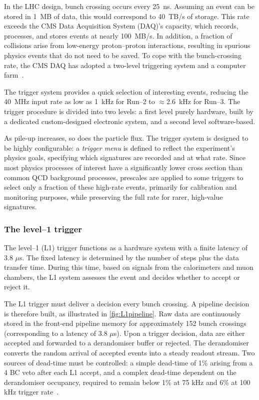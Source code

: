 In the LHC design, bunch crossing occurs every 25~ns. Assuming an event can be stored in 1~MB of data, this would correspond to 40~TB/s of storage. This rate exceeds the CMS Data Acquisition System (DAQ)'s capacity, which records, processes, and stores events at nearly 100~MB/s. In addition, a fraction of collisions arise from low-energy proton--proton interactions, resulting in spurious physics events that do not need to be saved. To cope with the bunch-crossing rate, the CMS DAQ has adopted a two-level triggering system and a computer farm~\cite{CMStrigger}. 

The trigger system provides a quick selection of interesting events, reducing the 40~MHz input rate as low as 1~kHz for Run--2 to $\approx$2.6~kHz for Run--3. The trigger procedure is divided into two levels: a first level purely hardware, built by a dedicated custom-designed electronic system, and a second level software-based.

As pile-up increases, so does the particle flux. The trigger system is designed to be highly configurable: a \textit{trigger menu} is defined to reflect the experiment's physics goals, specifying which signatures are recorded and at what rate. Since most physics processes of interest have a significantly lower cross section than common QCD background processes, prescales are applied to some triggers to select only a fraction of these high-rate events, primarily for calibration and monitoring purposes, while preserving the full rate for rarer, high-value signatures.

\subsubsection{The level--1 trigger}

The level--1 (L1) trigger functions as a hardware system with a finite latency of 3.8 $\mu$s. The fixed latency is determined by the number of steps plus the data transfer time. During this time, based on signals from the calorimeters and muon chambers, the L1 system assesses the event and decides whether to accept or reject it.

The L1 trigger must deliver a decision every bunch crossing. A pipeline decision is therefore built, as illustrated in \cref{fig:L1pipeline}. Raw data are continuously stored in the front-end pipeline memory for approximately 152 bunch crossings (corresponding to a latency of 3.8 $\mu$s). Upon a trigger decision, data are either accepted and forwarded to a derandomiser buffer or rejected. The derandomiser converts the random arrival of accepted events into a steady readout stream. Two sources of dead-time must be controlled: a simple dead-time of 1\% arising from a 4 BC veto after each L1 accept, and a complex dead-time dependent on the derandomiser occupancy, required to remain below 1\% at 75 kHz and 6\% at 100 kHz trigger rate~\cite{CMStrigger}.

